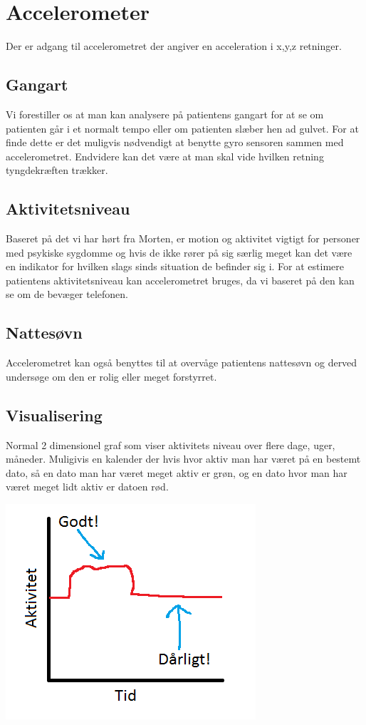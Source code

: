 \section{Accelerometer}
Der er adgang til accelerometret der angiver en acceleration i x,y,z retninger.

\subsection{Gangart}
Vi forestiller os at man kan analysere på patientens gangart for at se om patienten går i et normalt tempo eller om patienten slæber hen ad gulvet.
For at finde dette er det muligvis nødvendigt at benytte gyro sensoren sammen med accelerometret.
Endvidere kan det være at man skal vide hvilken retning tyngdekræften trækker.

\subsection{Aktivitetsniveau}
Baseret på det vi har hørt fra Morten, er motion og aktivitet vigtigt for personer med psykiske sygdomme og hvis de ikke rører på sig særlig meget kan det være en indikator for hvilken slags sinds situation de befinder sig i.
For at estimere patientens aktivitetsniveau kan accelerometret bruges, da vi baseret på den kan se om de bevæger telefonen. 

\subsection{Nattesøvn}
Accelerometret kan også benyttes til at overvåge patientens nattesøvn og derved undersøge om den er rolig eller meget forstyrret.


\subsection{Visualisering} Normal 2 dimensionel graf som viser aktivitets niveau over flere dage, uger, måneder. Muligivis en kalender der hvis hvor aktiv man har været på en bestemt dato, så en dato man har været meget aktiv er grøn, og en dato hvor man har været meget lidt aktiv er datoen rød.

\includegraphics{graphics/aktivitet_billed}

